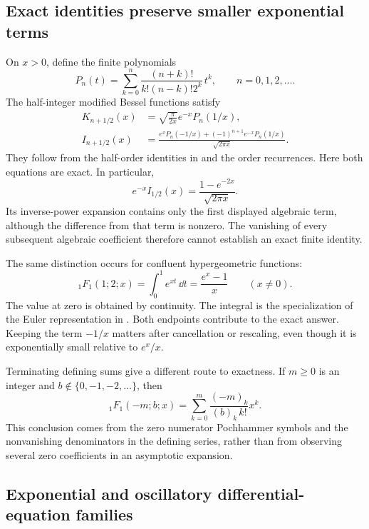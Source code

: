 \subsection{Exact identities preserve smaller exponential terms}

On $x>0$, define the finite polynomials
\[
 P_n(t)=\sum_{k=0}^n
       \frac{(n+k)!}{k!(n-k)!2^k}\,t^k,
 \qquad n=0,1,2,\ldots.
\]
The half-integer modified Bessel functions satisfy
\begin{equation}
\begin{aligned}
 K_{n+1/2}(x)
   &=\sqrt{\frac{\pi}{2x}}e^{-x}P_n(1/x),\\
 I_{n+1/2}(x)
   &=\frac{e^xP_n(-1/x)+(-1)^{n+1}e^{-x}P_n(1/x)}
           {\sqrt{2\pi x}}.
\end{aligned}
\label{eq:special-function-half-integer-bessel}
\end{equation}
They follow from the half-order identities in
\cite[\S10.39]{dlmf} and the order recurrences. Here both equations
are exact. In particular,
\[
 e^{-x}I_{1/2}(x)
   =\frac{1-e^{-2x}}{\sqrt{2\pi x}}.
\]
Its inverse-power expansion contains only the first displayed algebraic
term, although the difference from that term is nonzero. The vanishing
of every subsequent algebraic coefficient therefore cannot establish
an exact finite identity.

The same distinction occurs for confluent hypergeometric functions:
\begin{equation}
 {}_1F_1(1;2;x)=\int_0^1e^{xt}\,\dd t
               =\frac{e^x-1}{x}\qquad(x\ne0).
 \label{eq:special-function-hypergeometric-endpoint}
\end{equation}
The value at zero is obtained by continuity. The integral is the
specialization of the Euler representation in
\cite[(13.4.1)]{dlmf}. Both endpoints contribute to the exact answer.
Keeping the term $-1/x$ matters after cancellation or rescaling, even
though it is exponentially small relative to $e^x/x$.

Terminating defining sums give a different route to exactness. If
$m\ge0$ is an integer and $b\notin\{0,-1,-2,\ldots\}$, then
\[
 {}_1F_1(-m;b;x)
   =\sum_{k=0}^{m}\frac{(-m)_k}{(b)_k\,k!}x^k.
\]
This conclusion comes from the zero numerator Pochhammer symbols and
the nonvanishing denominators in the defining series, rather than from
observing several zero coefficients in an asymptotic expansion.

\subsection{Exponential and oscillatory differential-equation families}

